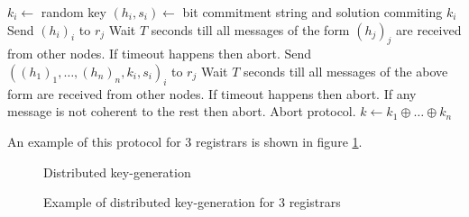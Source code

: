 \begin{algorithm}[tb]
  \begin{algorithmic}[1]
  \STATE $k_i \leftarrow $ random key
  \STATE $(h_i, s_i) \leftarrow $ bit commitment string and solution commiting
  $k_i$
    \STATE Send $(h_i)_{i}$ to $r_j$
  \ENDFOR
  \STATE Wait $T$ seconds till all messages of the form $(h_j)_j$ are received
  from other nodes. If timeout happens then abort.
    \STATE Send $\left( (h_1)_1, \ldots, (h_n)_{n}, k_i, s_i\right)_i$ to $r_j$
  \ENDFOR
  \STATE Wait $T$ seconds till all messages of the above form are received
  from other nodes. If timeout happens then abort. If any message is not
  coherent to the rest then abort.
      \STATE Abort protocol.
    \ENDIF
  \ENDFOR
  \STATE $k \leftarrow k_1 \oplus \ldots \oplus k_n$
\end{algorithmic}
  \caption{Distributed key generation algorithm generating random key $k$}
  \label{alg:key_gen_alg}
\end{algorithm}

An example of this protocol for 3 registrars is shown in figure
\ref{fig:key_gen_example}.

\begin{figure}[tbp]
\begin{msc}{Distributed key-generation}
\setlength{\instdist}{5.5cm}
\setlength{\envinstdist}{3cm}
\nextlevel[5]
\nextlevel[2]
\nextlevel[2]
\nextlevel[2]
\nextlevel[2]
\nextlevel[2]
\nextlevel[2]
\nextlevel[2]
\nextlevel[2]
\nextlevel[2]
\nextlevel[4]
\end{msc}
\caption{Example of distributed key-generation for 3 registrars}
\label{fig:key_gen_example}
\end{figure}

